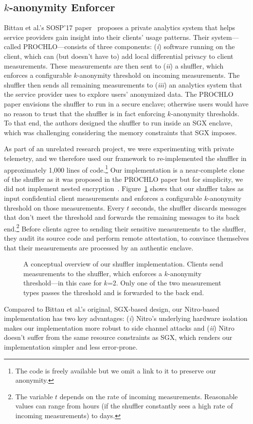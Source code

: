 \subsection{$k$-anonymity Enforcer}
\label{sec:shuffler}

Bittau et al.'s SOSP'17 paper~\cite{Bittau2017a} proposes a private analytics
system that helps service providers gain insight into their clients' usage
patterns.  Their system---called PROCHLO---consists of three components:
(\emph{i}) software running on the client, which can (but doesn't have to) add
local differential privacy to client measurements.  These measurements are then
sent to (\emph{ii}) a shuffler, which enforces a configurable $k$-anonymity
threshold on incoming measurements.  The shuffler then sends all remaining
measurements to (\emph{iii}) an analytics system that the service provider uses
to explore users' anonymized data.  The PROCHLO paper envisions the shuffler to
run in a secure enclave; otherwise users would have no reason to trust that the
shuffler is in fact enforcing $k$-anonymity thresholds.  To that end, the
authors designed the shuffler to run inside an SGX enclave, which was
challenging considering the memory constraints that SGX imposes.

As part of an unrelated research project, we were experimenting with private
telemetry, and we therefore used our framework to re-implemented the shuffler in
approximately 1,000 lines of code.\footnote{The code is freely available but we
omit a link to it to preserve our anonymity.}  Our implementation is a
near-complete clone of the shuffler as it was proposed in the PROCHLO paper but
for simplicity, we did not implement nested encryption~\cite[\S~3]{Bittau2017a}.
Figure~\ref{fig:shuffler} shows that our shuffler takes as input confidential
client measurements and enforces a configurable $k$-anonymity threshold on those
measurements.  Every $t$ seconds, the shuffler discards messages that don't meet
the threshold and forwards the remaining messages to its back end.\footnote{The
variable $t$ depends on the rate of incoming measurements.  Reasonable values
can range from hours (if the shuffler constantly sees a high rate of incoming
measurements) to days.} Before clients agree to sending their sensitive
measurements to the shuffler, they audit its source code and perform remote
attestation, to convince themselves that their measurements are processed by an
authentic enclave.

\begin{figure}[t]
\centering

\caption{A conceptual overview of our shuffler implementation.  Clients send
  measurements to the shuffler, which enforces a $k$-anonymity threshold---in
  this case for $k$=2. Only one of the two measurement types passes the
  threshold and is forwarded to the back end.}
\label{fig:shuffler}
\end{figure}

Compared to Bittau et al.'s original, SGX-based design, our Nitro-based
implementation has two key advantages: (\emph{i}) Nitro's underlying hardware
isolation makes our implementation more robust to side channel attacks and
(\emph{ii}) Nitro doesn't suffer from the same resource constraints as SGX,
which renders our implementation simpler and less error-prone.
